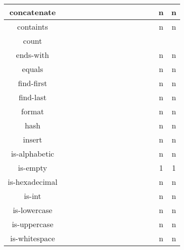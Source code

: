 \documentclass[anonymous,sigplan,review,11pt,nonacm,natbib=false]{acmart}
\begin{document}
\begin{table*}[]
\begin{tabular}{|c||c|c|c|c|c|c|c|c|c|c|c|c|c|c|}
            concatenate &  &  &  &  &  &  &  &  &  &  &  &  & n & n \\ \hline

            containts &  &  &  &  &  &  &  &  &  &  &  &  & n & n \\ \hline

            count &  &  &  &  &  &  &  &  &  &  &  &  &  & \\ \hline

            ends-with &  &  &  &  &  &  &  &  &  &  &  &  & n & n \\ \hline

            equals &  &  &  &  &  &  &  &  &  &  &  &  & n & n \\ \hline

            find-first &  &  &  &  &  &  &  &  &  &  &  &  & n & n \\ \hline

            find-last &  &  &  &  &  &  &  &  &  &  &  &  & n & n \\ \hline

            format &  &  &  &  &  &  &  &  &  &  &  &  & n & n \\ \hline

            hash &  &  &  &  &  &  &  &  &  &  &  &  & n & n \\ \hline

            insert &  &  &  &  &  &  &  &  &  &  &  &  & n & n \\ \hline

            is-alphabetic &  &  &  &  &  &  &  &  &  &  &  &  & n & n \\ \hline

            is-empty &  &  &  &  &  &  &  &  &  &  &  &  & 1 & 1 \\ \hline

            is-hexadecimal &  &  &  &  &  &  &  &  &  &  &  &  & n & n \\ \hline

            is-int &  &  &  &  &  &  &  &  &  &  &  &  & n & n \\ \hline

            is-lowercase &  &  &  &  &  &  &  &  &  &  &  &  & n & n \\ \hline

            is-uppercase &  &  &  &  &  &  &  &  &  &  &  &  & n & n \\ \hline

            is-whitespace &  &  &  &  &  &  &  &  &  &  &  &  & n & n \\ \hline


\end{tabular}
\end{table*}
\end{document}
